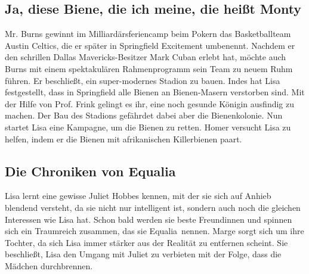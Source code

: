     
\subsection{Ja, diese Biene, die ich meine, die heißt Monty}
Mr. Burns gewinnt im Milliardärsferiencamp beim Pokern das Basketballteam Austin Celtics, die er später in Springfield Excitement umbenennt. Nachdem er den schrillen Dallas Mavericks-Besitzer Mark Cuban erlebt hat, möchte auch Burns mit einem spektakulären Rahmenprogramm sein Team zu neuem Ruhm führen. Er beschließt, ein super-modernes Stadion zu bauen. Indes hat Lisa festgestellt, dass in Springfield alle Bienen an Bienen-Masern verstorben sind. Mit der Hilfe von Prof. Frink gelingt es ihr, eine noch gesunde Königin ausfindig zu machen. Der Bau des Stadions gefährdet dabei aber die Bienenkolonie. Nun startet Lisa eine Kampagne, um die Bienen zu retten. Homer versucht Lisa zu helfen, indem er die Bienen mit afrikanischen Killerbienen paart. 



\subsection{Die Chroniken von Equalia}\label{KABF22}
Lisa lernt eine gewisse Juliet Hobbes kennen, mit der sie sich auf Anhieb blendend versteht, da sie nicht nur intelligent ist, sondern auch noch die gleichen Interessen wie Lisa hat. Schon bald werden sie beste Freundinnen und spinnen sich ein Traumreich zusammen, das sie \glqq Equalia\grqq\ nennen. Marge sorgt sich um ihre Tochter, da sich Lisa immer stärker aus der Realität zu entfernen scheint. Sie beschließt, Lisa den Umgang mit Juliet zu verbieten mit der Folge, dass die Mädchen durchbrennen.


